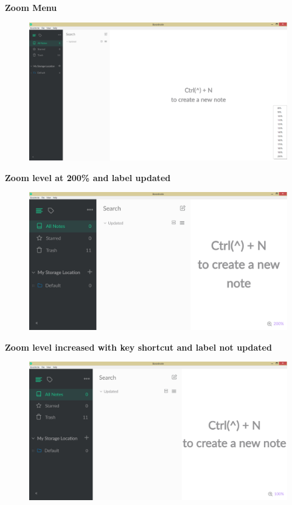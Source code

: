 \documentclass[main.tex]{subfiles}
\begin{document}
\textbf{Zoom Menu}\\

\begin{figure}[h]
\includegraphics[scale=0.2]{images/zoomMenu.png}
\centering
\end{figure}

\textbf{Zoom level at 200\% and label updated}\\

\begin{figure}[h]
\includegraphics[scale=0.2]{images/zoomIn.png}
\centering
\end{figure}
\clearpage

\textbf{Zoom level increased with key shortcut and label not updated}\\

\begin{figure}[h]
\includegraphics[scale=0.2]{images/zoomInUn.png}
\centering
\end{figure}
\end{document}
